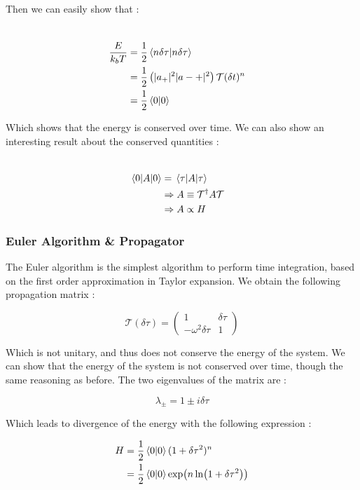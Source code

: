 \documentclass[ansiapaper]{report}
\begin{document}
\begin{multicols}{3}
  Then we can easily show that :

  \begin{align*}
    \\ \frac{E}{k_bT} &= \frac{1}{2}\braket{n \delta \tau}{n \delta \tau}
    \\ &=\frac{1}{2}\left(\lvert a_+ \rvert^2 \lvert a-+ \rvert^2 \right)\mathcal{T}(\delta t)^n
    \\ &= \frac{1}{2} \braket{0}{0}
  \end{align*}

  Which shows that the energy is conserved over time. We can also show an interesting result about the conserved quantities :

  \begin{align*}
    \\ \expval{A}{0} &=\expval{A}{\tau}
    \\  & \Rightarrow A \equiv \mathcal{T}^\dagger A \mathcal{T}
    \\ & \Rightarrow A \propto H
  \end{align*}

  \subsubsection{Euler Algorithm \& Propagator}

  The Euler algorithm is the simplest algorithm to perform time integration, based on the first order approximation in Taylor expansion. We obtain the following propagation matrix :

  $$ \mathcal{T}(\delta \tau) =
    \begin{pmatrix}
      1                     & \delta \tau \\
      -\omega^2 \delta \tau & 1
    \end{pmatrix}
  $$

  Which is not unitary, and thus does not conserve the energy of the system. We can show that the energy of the system is not conserved over time, though the same reasoning as before. The two eigenvalues of the matrix are :

  $$ \lambda_\pm = 1 \pm i \delta \tau$$

  Which leads to divergence of the energy with the following expression :

  \begin{align*}
    H & = \frac{1}{2}\braket{0}{0}(1 + \delta \tau^2)^n          \\
      & = \frac{1}{2}\braket{0}{0}\exp(n \ln(1 + \delta \tau^2))
    \\
  \end{align*}


\end{multicols}
\end{document}
